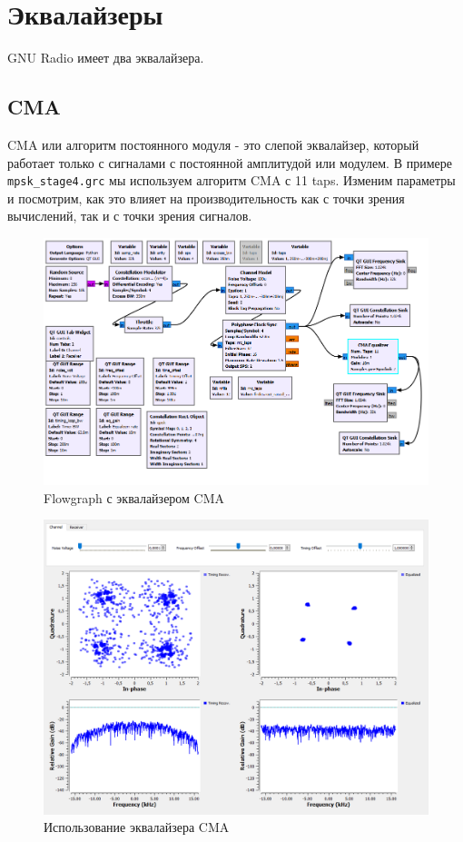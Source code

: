 \documentclass[a4paper, 14pt]{extarticle}
\begin{document}
    \newpage


    \section{Эквалайзеры}
    \label{sec:5}

    GNU Radio имеет два эквалайзера.

    \subsection{CMA}

    CMA или алгоритм постоянного модуля - это слепой эквалайзер, который работает только с сигналами с постоянной амплитудой или модулем.
    В примере \texttt{mpsk\_stage4.grc} мы используем алгоритм CMA с 11 taps.
    Изменим параметры и посмотрим, как это влияет на производительность как с точки зрения вычислений, так и с точки зрения сигналов.

    \begin{figure}[H]
        \centering
        \includegraphics[width=0.8\linewidth]{flowgraph_eq}
        \caption{Flowgraph с эквалайзером CMA}
        \label{fig:flowgraph_eq}
    \end{figure}

    \begin{figure}[H]
        \centering
        \includegraphics[width=0.8\linewidth]{eq_cma}
        \caption{Использование эквалайзера CMA}
        \label{fig:eq_cma}
    \end{figure}
\end{document}
